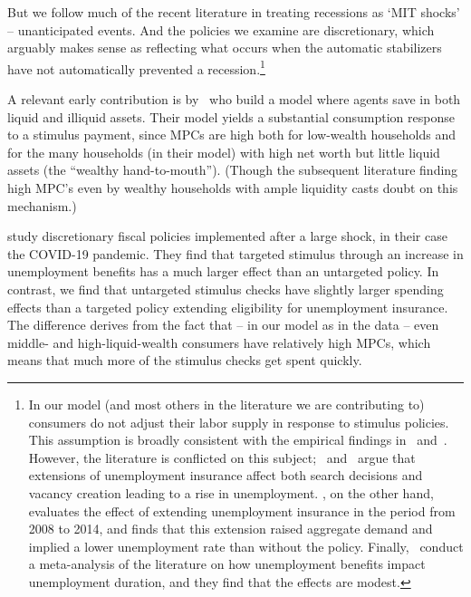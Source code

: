 \documentclass[\PathToRoot/\ProjectName]{subfiles}
\begin{document}
But we follow much of the recent literature in treating recessions as `MIT shocks' -- unanticipated events. And the policies we examine are discretionary, which arguably makes sense as reflecting what occurs when the automatic stabilizers have not automatically prevented a recession.\footnote{
  In our model (and most others in the literature we are contributing to) consumers do not adjust their labor supply in response to stimulus policies. 
  This assumption is broadly consistent with the empirical findings in~\cite{ganong2022spending} and~\cite{chodorow2016limited}.
  However, the literature is conflicted on this subject;~\cite{hmmUnemployment} and~\cite{hagedorn2019unemployment} argue that extensions of unemployment insurance affect both search decisions and vacancy creation leading to a rise in unemployment.
  \cite{kekre2022unemp}, on the other hand, evaluates the effect of extending unemployment insurance in the period from 2008 to 2014, and finds that this extension raised aggregate demand and implied a lower unemployment rate than without the policy.
  Finally,~\cite{cohenDisemployment} conduct a meta-analysis of the literature on how unemployment benefits impact unemployment duration, and they find that the effects are modest.}

A relevant early contribution is by~\cite{kaplan2014model} who build a model where agents save in both liquid and illiquid assets. %
Their model yields a substantial consumption response to a stimulus payment, since MPCs are high both for low-wealth households and for the many households (in their model) with high net worth but little liquid assets (the ``wealthy hand-to-mouth'').  (Though the subsequent literature finding high MPC's even by wealthy households with ample liquidity casts doubt on this mechanism.)

\cite{bayercoronavirus} study discretionary fiscal policies implemented after a large shock, in their case the COVID-19 pandemic. %
They find that targeted stimulus through an increase in unemployment benefits has a much larger effect than an untargeted policy.
In contrast, we find that untargeted stimulus checks have slightly larger spending effects than a targeted policy extending eligibility for unemployment insurance. %
The difference derives from the fact that -- in our model as in the data -- even middle- and high-liquid-wealth consumers have relatively high MPCs, which means that much more of the stimulus checks get spent quickly.
\end{document}
